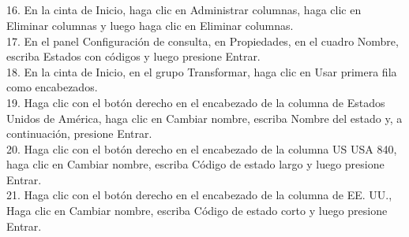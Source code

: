\documentclass[12pt,letterpaper]{article}
\begin{document}
\begin{flushleft}
\begin{itemize}
\textbf{ }\\
\textbf{ }\\
\textbf{ }\\
\textbf{ }\\
\textbf{ }\\
\textbf{ }\\
\textbf{ }\\
\textbf{ }\\
\textbf{ }\\
16. En la cinta de Inicio, haga clic en Administrar columnas, haga clic en Eliminar columnas y luego haga clic en Eliminar columnas.\\
17. En el panel Configuración de consulta, en Propiedades, en el cuadro Nombre, escriba Estados con códigos y luego presione
Entrar.\\
18. En la cinta de Inicio, en el grupo Transformar, haga clic en Usar primera fila como encabezados.\\
19. Haga clic con el botón derecho en el encabezado de la columna de Estados Unidos de América, haga clic en Cambiar nombre, escriba Nombre del estado y, a continuación, presione
Entrar.\\
20. Haga clic con el botón derecho en el encabezado de la columna US USA 840, haga clic en Cambiar nombre, escriba Código de estado largo y luego presione Entrar.\\
21. Haga clic con el botón derecho en el encabezado de la columna de EE. UU., Haga clic en Cambiar nombre, escriba Código de estado corto y luego presione Entrar.\\


\end{itemize}
\end{flushleft}
\end{document}
